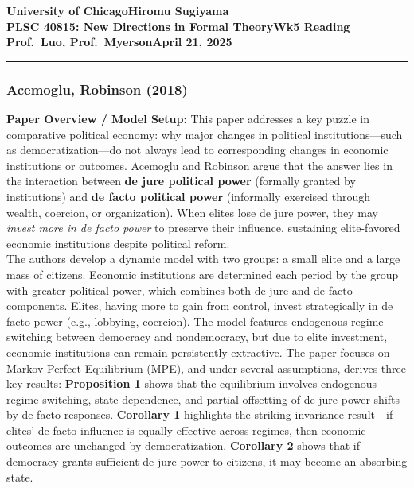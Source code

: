 \documentclass[10.5pt]{article}    %
\newcommand{\myname}{Hiromu Sugiyama}
\newcommand{\assignment}{Wk5 Reading}
\newcommand{\duedate}{April 21, 2025}
\begin{document}
\textbf{University of Chicago}\hfill\textbf{\myname}\\[0.01in]
\textbf{PLSC 40815: New Directions in Formal Theory}\hfill\textbf{\assignment}\\[0.01in]
\textbf{Prof.\ Luo, Prof.\ Myerson}\hfill\textbf{\duedate}\\
\smallskip\hrule\bigskip

\onespacing                   %
\subsubsection*{Acemoglu, Robinson (2018)}
\textbf{Paper Overview / Model Setup:} This paper addresses a key puzzle in comparative political economy: why major changes in political institutions---such as democratization---do not always lead to corresponding changes in economic institutions or outcomes. Acemoglu and Robinson argue that the answer lies in the interaction between \textbf{de jure political power} (formally granted by institutions) and \textbf{de facto political power} (informally exercised through wealth, coercion, or organization). When elites lose de jure power, they may \textit{invest more in de facto power} to preserve their influence, sustaining elite-favored economic institutions despite political reform.\\

The authors develop a dynamic model with two groups: a small elite and a large mass of citizens. Economic institutions are determined each period by the group with greater political power, which combines both de jure and de facto components. Elites, having more to gain from control, invest strategically in de facto power (e.g., lobbying, coercion). The model features endogenous regime switching between democracy and nondemocracy, but due to elite investment, economic institutions can remain persistently extractive. The paper focuses on Markov Perfect Equilibrium (MPE), and under several assumptions, derives three key results: \textbf{Proposition 1} shows that the equilibrium involves endogenous regime switching, state dependence, and partial offsetting of de jure power shifts by de facto responses. \textbf{Corollary 1} highlights the striking invariance result—if elites' de facto influence is equally effective across regimes, then economic outcomes are unchanged by democratization. \textbf{Corollary 2} shows that if democracy grants sufficient de jure power to citizens, it may become an absorbing state.\\
\end{document}
